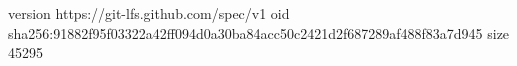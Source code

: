 version https://git-lfs.github.com/spec/v1
oid sha256:91882f95f03322a42ff094d0a30ba84acc50c2421d2f687289af488f83a7d945
size 45295
